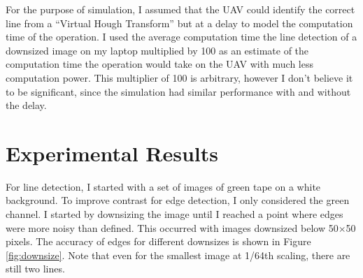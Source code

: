 \documentclass[10pt,twocolumn,letterpaper]{article}
\begin{document}
	For the purpose of simulation, I assumed that the UAV could identify the correct line from a ``Virtual Hough Transform'' but at a delay to model the computation time of the operation. I used the average computation time the line detection of a downsized image on my laptop multiplied by 100 as an estimate of the computation time the operation would take on the UAV with much less computation power. This multiplier of 100 is arbitrary, however I don't believe it to be significant, since the simulation had similar performance with and without the delay. 
	
	\section{Experimental Results}
	
	For line detection, I started with a set of images of green tape on a white background. To improve contrast for edge detection, I only considered the green channel. I started by downsizing the image until I reached a point where edges were more noisy than defined. This occurred with images downsized below 50$\times$50 pixels. The accuracy of edges for different downsizes is shown in Figure \ref{fig:downsize}. Note that even for the smallest image at 1/64th scaling, there are still two lines. 
		
\end{document}
